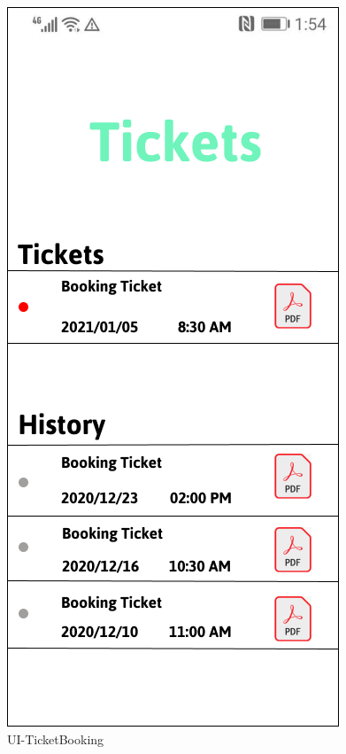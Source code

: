 \documentclass[a4paper,12pt]{report}
\begin{document}
\begin{figure}[H]
	\begin{minipage}[t]{0.56\linewidth}
		\centering
		\includegraphics[scale=0.5]{UI-TicketBooking.png}
		\caption{UI-TicketBooking}
		\label{fig:UI-TicketBooking}
	\end{minipage}%
	\begin{minipage}[t]{0.56\linewidth}
		\centering

\end{minipage}
\end{figure}
\end{document}
